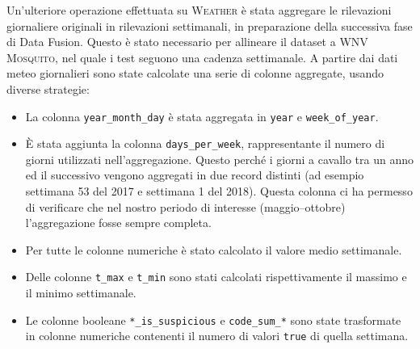 Un'ulteriore operazione effettuata su \textsc{Weather} è stata aggregare le 
rilevazioni giornaliere originali in rilevazioni settimanali, in preparazione 
della successiva fase di Data Fusion. Questo è stato necessario per allineare 
il dataset a \textsc{WNV Mosquito}, nel quale i test seguono una cadenza 
settimanale. A partire dai dati meteo giornalieri sono state calcolate una 
serie di colonne aggregate, usando diverse strategie:
\begin{itemize}
	\item La colonna \texttt{year\_month\_day} è stata aggregata in 
	\texttt{year} e \texttt{week\_of\_year}.
	
	\item È stata aggiunta la colonna \texttt{days\_per\_week}, rappresentante 
	il numero di giorni utilizzati nell'aggregazione. Questo perché i giorni a 
	cavallo tra un anno ed il successivo vengono aggregati in due record 
	distinti (ad esempio settimana 53 del 2017 e settimana 1 del 2018). Questa 
	colonna ci ha permesso di verificare che nel nostro periodo di interesse 
	(maggio--ottobre) l'aggregazione fosse sempre completa.
	
	\item Per tutte le colonne numeriche è stato calcolato il valore medio 
	settimanale.
	
	\item Delle colonne \texttt{t\_max} e \texttt{t\_min} sono stati calcolati 
	rispettivamente il massimo e il minimo settimanale.
	
	\item Le colonne booleane \texttt{*\_is\_suspicious} e 
	\texttt{code\_sum\_*} sono state trasformate in colonne numeriche 
	contenenti il numero di valori \texttt{true} di quella settimana.
\end{itemize}
